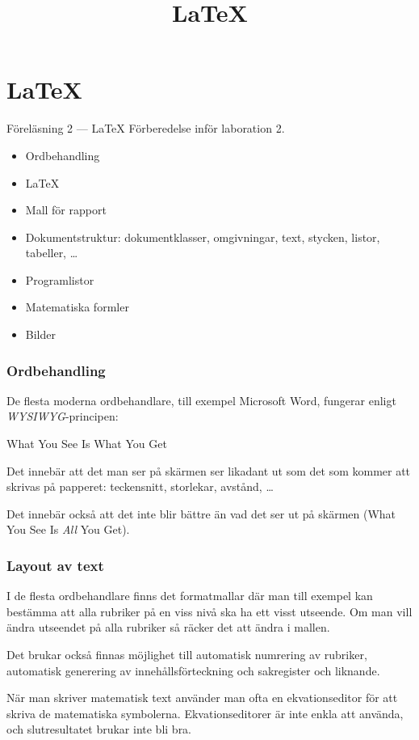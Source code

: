 
\title{\LaTeX}
\section{\LaTeX}

\begin{frame}[fragile=singleslide]
\label{latex}
\begin{block}{\centering\Large Föreläsning 2 --- \LaTeX}
Förberedelse inför laboration 2.

\begin{itemize}
\item Ordbehandling
\item \LaTeX
\item Mall för rapport
\item Dokumentstruktur: dokumentklasser, omgivningar, text, stycken, listor, tabeller, \ldots
\item Programlistor
\item Matematiska formler
\item Bilder
\end{itemize}
\end{block}
\end{frame} 

\begin{frame}[fragile=singleslide]
\frametitle{Ordbehandling}
De flesta moderna ordbehandlare, till exempel Microsoft Word,  fungerar 
enligt \emph{WYSIWYG}-principen:

\blankline
\begin{center}
What You See Is What You Get
\end{center}

\blankline
Det innebär att det man ser på skärmen ser likadant ut som det som kommer
att skrivas på papperet: teckensnitt, storlekar, avstånd, \ldots

Det innebär också att det inte blir bättre än vad det ser ut
på skärmen (What You See Is \emph{All} You Get).
\end{frame} 

\begin{frame}[fragile=singleslide]
\frametitle{Layout av text}
I de flesta ordbehandlare finns det
formatmallar där man till exempel kan bestämma att alla rubriker på
en viss nivå ska ha ett visst utseende. Om man vill ändra
utseendet på alla rubriker så räcker det att ändra i mallen.

\blankline
Det brukar också finnas möjlighet till automatisk numrering av 
rubriker, automatisk generering av innehållsförteckning och 
sakregister och liknande. 

\blankline
När man skriver matematisk text använder man ofta en ekvationseditor
för att skriva de matematiska symbolerna. Ekvationseditorer är inte
enkla att använda, och slutresultatet brukar inte bli bra.
\end{frame} 


